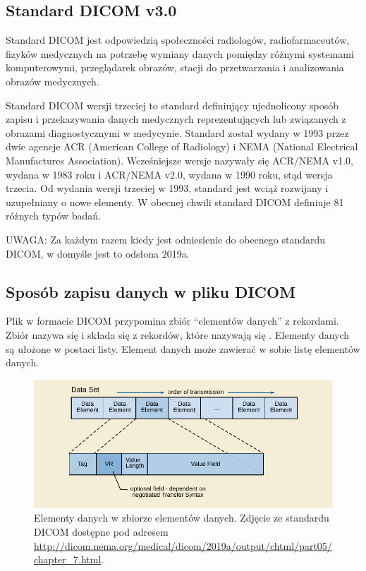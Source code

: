 \subsection{Standard DICOM v3.0}

\par
Standard DICOM jest odpowiedzią społeczności radiologów, radiofarmaceutów, fizyków medycznych na potrzebę wymiany danych pomiędzy różnymi systemami komputerowymi, przeglądarek obrazów,  stacji do przetwarzania i analizowania obrazów medycznych.

\par
Standard DICOM wersji trzeciej to standard definiujący ujednolicony sposób zapisu i przekazywania danych medycznych reprezentujących lub związanych z obrazami diagnostycznymi w medycynie.
Standard został wydany w 1993 przez dwie agencje ACR (American College of Radiology) i NEMA (National Electrical Manufactures Association).
Wcześniejsze wersje nazywały się ACR/NEMA v1.0, wydana w 1983 roku i ACR/NEMA v2.0, wydana w 1990 roku, stąd wersja trzecia.
Od wydania wersji trzeciej w 1993, standard jest wciąż rozwijany i uzupełniany o nowe elementy.
W obecnej chwili standard DICOM definiuje 81 różnych typów badań.

UWAGA: Za każdym razem kiedy jest odniesienie do obecnego standardu DICOM, w domyśle jest to odsłona 2019a.

\subsection{Sposób zapisu danych w pliku DICOM}

\par
Plik w formacie DICOM przypomina zbiór \enquote{elementów danych} z rekordami.
Zbiór nazywa się  i składa się z rekordów, które nazywają się .
Elementy danych są ułożone w postaci listy.
Element danych może zawierać w sobie listę elementów danych.

\begin{figure}[!htbp]
    \centering
    \includegraphics[]{img/dicom-dataelement001.pdf}
    \caption{Elementy danych w zbiorze elementów danych. Zdjęcie ze standardu DICOM dostępne pod adresem \url{http://dicom.nema.org/medical/dicom/2019a/output/chtml/part05/chapter_7.html}.}
    \label{fig:dicom-dataelement}
\end{figure}

